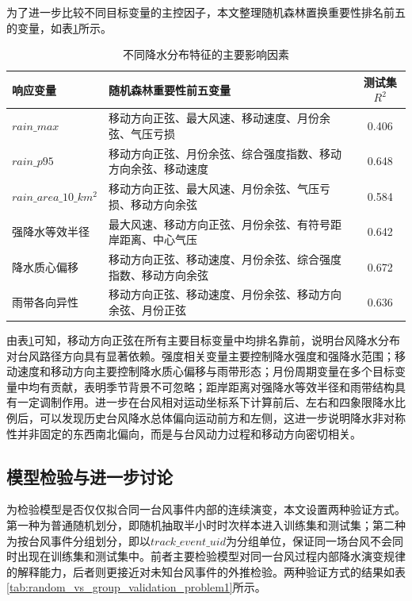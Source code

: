 \documentclass[UTF8,a4paper,zihao=5]{ctexart}
\numberwithin{equation}{section}
\numberwithin{figure}{section}
\numberwithin{table}{section}
\begin{document}
为了进一步比较不同目标变量的主控因子，本文整理随机森林置换重要性排名前五的变量，如表\ref{tab:rf_top_factors_problem1}所示。

\begin{table}[htbp]
    \centering
    \caption{不同降水分布特征的主要影响因素}
    \label{tab:rf_top_factors_problem1}
    \begin{tabular}{p{}p{}c}
        \hline
        响应变量 & 随机森林重要性前五变量 & 测试集$R^2$ \\
        \hline
        $rain\_max$ & 移动方向正弦、最大风速、移动速度、月份余弦、气压亏损 & 0.406 \\
        $rain\_p95$ & 移动方向正弦、月份余弦、综合强度指数、移动方向余弦、移动速度 & 0.648 \\
        $rain\_area\_10\_km^2$ & 移动方向正弦、最大风速、月份余弦、气压亏损、移动方向余弦 & 0.584 \\
        强降水等效半径 & 最大风速、移动方向正弦、月份余弦、有符号距岸距离、中心气压 & 0.642 \\
        降水质心偏移 & 移动方向正弦、移动速度、月份余弦、综合强度指数、移动方向余弦 & 0.672 \\
        雨带各向异性 & 移动方向正弦、移动速度、月份余弦、移动方向余弦、月份正弦 & 0.636 \\
        \hline
    \end{tabular}
\end{table}

由表\ref{tab:rf_top_factors_problem1}可知，移动方向正弦在所有主要目标变量中均排名靠前，说明台风降水分布对台风路径方向具有显著依赖。强度相关变量主要控制降水强度和强降水范围；移动速度和移动方向主要控制降水质心偏移与雨带形态；月份周期变量在多个目标变量中均有贡献，表明季节背景不可忽略；距岸距离对强降水等效半径和雨带结构具有一定调制作用。进一步在台风相对运动坐标系下计算前后、左右和四象限降水比例后，可以发现历史台风降水总体偏向运动前方和左侧，这进一步说明降水非对称性并非固定的东西南北偏向，而是与台风动力过程和移动方向密切相关。

\subsection{模型检验与进一步讨论}

为检验模型是否仅仅拟合同一台风事件内部的连续演变，本文设置两种验证方式。第一种为普通随机划分，即随机抽取半小时时次样本进入训练集和测试集；第二种为按台风事件分组划分，即以$track\_event\_uid$为分组单位，保证同一场台风不会同时出现在训练集和测试集中。前者主要检验模型对同一台风过程内部降水演变规律的解释能力，后者则更接近对未知台风事件的外推检验。两种验证方式的结果如表\ref{tab:random_vs_group_validation_problem1}所示。
\end{document}
